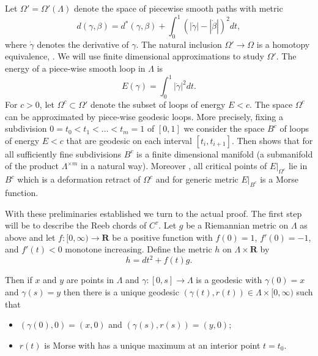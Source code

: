 \documentclass{gtpart}
\renewcommand{\R}{\mathbf{R}}
\begin{document}
Let $\Omega'=\Omega'(\Lambda)$ denote the space of piecewise smooth paths with metric
\[
d(\gamma,\beta) = d^{\ast}(\gamma,\beta)+ \int_{0}^{1}\left(|\dot\gamma|-|\dot{\beta}|\right)^{2}dt,
\]
where $\dot{\gamma}$ denotes the derivative of $\gamma$. The natural inclusion $\Omega'\to\Omega$ is
a homotopy equivalence, \cite[Theorem 17.1]{Milnor}. We will use finite dimensional approximations
to study $\Omega'$. The energy of a piece-wise smooth loop in $\Lambda$ is
\[
E(\gamma)= \int_0^{1}| \dot\gamma|^{2} dt.
\]
For $c>0$, let $\Omega^{c}\subset\Omega'$ denote the subset of loops of energy $E<c$. The space
$\Omega^{c}$ can be approximated by piece-wise geodesic loops. More precisely, fixing a subdivision
$0=t_{0}< t_{1}<\dots< t_{m}=1$ of $[0,1]$ we consider the space $B^{c}$ of loops of energy $E<c$
that are geodesic on each interval $[t_{i},t_{i+1}]$. Then \cite[Lemma 16.1]{Milnor} shows that for
all sufficiently fine subdivisions $B^{c}$ is a finite dimensional manifold (a submanifold of the
product $\Lambda^{\times m}$ in a natural way). Moreover \cite[Theorem 16.2]{Milnor}, all critical points of
$E|_{\Omega^c}$ lie in $B^{c}$ which is a deformation retract of $\Omega^{c}$ and for generic metric $E|_{B^{c}}$ is a Morse function. 

With these preliminaries established we turn to the actual proof. 
The first step will be to describe the Reeb chords of $C^{\tau}$. Let $g$ be a Riemannian metric on $\Lambda$ as above and let $f\colon [0,\infty)\to \R$ be a positive function with $f(0)=1$, $f'(0)=-1$, and $f'(t)<0$ monotone increasing. Define the metric $h$ on $\Lambda\times\R$ by
\[ 
h= dt^{2} + f(t) g.
\]




Then if $x$ and $y$ are points in $\Lambda$ and $\gamma\colon[0,s]\to\Lambda$ is a geodesic with $\gamma(0)=x$ and $\gamma(s)=y$ then there is a unique geodesic $(\gamma(t),r(t))\in\Lambda\times[0,\infty)$ such that
\begin{itemize}
	\item $(\gamma(0),0)=(x,0)$ and $(\gamma(s),r(s))=(y,0)$;
	\item $r(t)$ is Morse with has a unique maximum at an interior point $t=t_{0}$. 
\end{itemize}  
\end{document}
